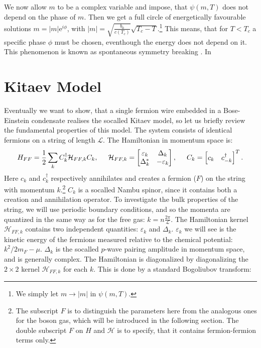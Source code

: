 We now allow $m$ to be a complex variable and impose, that $\psi(m, T)$ does not depend on the phase of $m$. Then we get a full circle of energetically favourable solutions $m = |m| \text{e}^{i\phi}$, with $|m| = \sqrt{\frac{b_0}{c(T_c)}}\sqrt{T_c-T}$.\footnote{We simply let $m \to |m|$ in $\psi(m, T)$.} This means, that for $T < T_c$ a specific phase $\phi$ must be chosen, eventhough the energy does not depend on it. This phenomenon is known as spontaneous symmetry breaking \cite[pp. 72-74]{BruusFlensberg}. In 

\section{Kitaev Model}
\label{sec.KitaevModel}
Eventually we want to show, that a single fermion wire embedded in a Bose-Einstein condensate realises the socalled Kitaev model, so let us briefly review the fundamental properties of this model. The system consists of identical fermions on a string of length $\mathcal{L}$. The Hamiltonian in momentum space is: 
\begin{equation}
H_{FF} = \frac{1}{2}\sum_{k} C^\dagger_k \mathcal{H}_{FF,k} C_k, \hspace{0.5cm} \mathcal{H}_{FF,k} = \begin{bmatrix} \varepsilon_k & \Delta_k \\ \Delta^*_k & -\varepsilon_k \end{bmatrix}, \hspace{0.5cm} C_k = \begin{bmatrix} c_k & c^\dagger_{-k} \end{bmatrix}^{T}. 
\label{eq.HKitaevpre}
\end{equation}
Here $c_k$ and $c_k^\dagger$ respectively annihilates and creates a fermion ($F$) on the string with momentum $k$.\footnote{The subscript $F$ is to distinguish the parameters here from the analogous ones for the boson gas, which will be introduced in the following section. The double subscript $F$ on $H$ and $\mathcal{H}$ is to specify, that it contains fermion-fermion terms only.} $C_k$ is a socalled Nambu spinor, since it contains both a creation and annihilation operator. To investigate the bulk properties of the string, we will use periodic boundary conditions, and so the momenta are quantized in the same way as for the free gas: $k = n\frac{2\pi}{\mathcal{L}}$. The Hamiltonian kernel $\mathcal{H}_{FF,k}$ contains two independent quantities: $\varepsilon_k$ and $\Delta_k$. $\varepsilon_k$ we will see is the kinetic energy of the fermions measured relative to the chemical potential: $k^2/2m_F-\mu$. $\Delta_k$ is the socalled $p$-wave pairing amplitude in momentum space, and is generally complex. The Hamiltonian is diagonalized by diagonalizing the $2\times 2$ kernel $\mathcal{H}_{FF,k}$ for each $k$. This is done by a standard Bogoliubov transform: 
